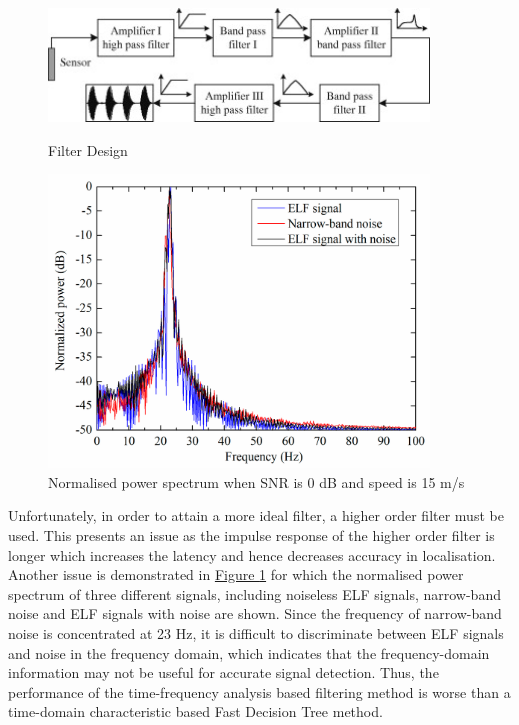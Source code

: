\documentclass[11pt]{article}		%
\newcommand{\figref}[1]{\hyperref[#1]{Figure \ref*{#1}}}    %
\begin{document}
	        \begin{figure}[h]
				\begin{minipage}{0.6\linewidth}
    				\centering
				    \includegraphics[width = 0.9\textwidth]{Filtering.jpg}
   				    \caption{Filter Design} %
    				\label{filterDesign}
				\end{minipage}
				\begin{minipage}{0.3\linewidth}
    				\centering
				    \includegraphics[width=0.9\textwidth]{SNRPower}
    				\caption{Normalised power spectrum when SNR is 0 dB and speed is 15 m/s}
    				\label{SNRPower}
				\end{minipage}
			\end{figure}
            \hspace*{2ex}Unfortunately, in order to attain a more ideal filter, a higher order filter must be used.
			This presents an issue as the impulse response of the higher order filter is longer which increases the latency and hence decreases accuracy in localisation. 
			Another issue is demonstrated in \figref{SNRPower} for which the normalised power spectrum of three different signals, including noiseless ELF signals, narrow-band noise and ELF signals with noise are shown. 
			Since the frequency of narrow-band noise is concentrated at 23 Hz, it is difficult to discriminate between ELF signals and noise in the frequency domain, which indicates that the frequency-domain information may not be useful for accurate signal detection. 
			Thus, the performance of the time-frequency analysis based filtering method is worse than a time-domain characteristic based Fast Decision Tree method.
	
\end{document}

